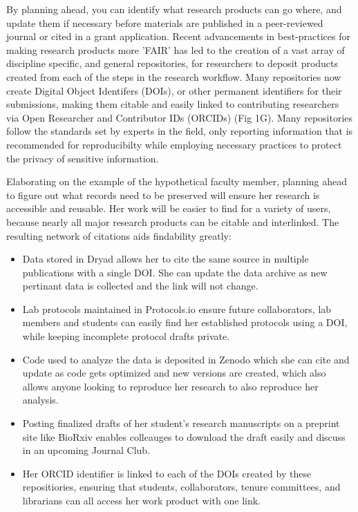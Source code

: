 \documentclass[10pt,letterpaper]{article}
\begin{document}
By planning ahead, you can identify what research products can go where, and update them if
necessary before materials are published in a peer-reviewed journal or cited in a 
grant application. 
Recent advancements in best-practices for making research products more 'FAIR' has led to the creation of a vast array of discipline specific, and general repositories\cite{PLOS2020}, for researchers to deposit products created from each of the steps in the research workflow.
Many repositories now create Digital Object Identifers (DOIs)\cite{DOI2020}, or other permanent identifiers
for their submissions, making them citable and easily linked to contributing researchers via Open 
Researcher and Contributor IDs (ORCIDs)\cite{ORCID2020} (Fig 1G). Many repositories follow the standards
set by experts in the field, only reporting information that is recommended for reproducibilty
while employing necessary practices to protect the privacy of sensitive information. 

Elaborating on the example of the hypothetical faculty member, planning ahead to figure out what records need to be preserved will ensure her research is accessible and reusable.  Her work will be easier to find for a variety of users, because nearly all major research products can be citable and interlinked.  The resulting network of citations aids findability greatly:

\begin{itemize}

\item
  Data stored in Dryad\cite{DRYAD2020} allows her to cite the same source in
  multiple publications with a single DOI. She can update the data archive as new
  pertinant data is collected and the link will not change.
 
\item
  Lab protocols maintained in Protocols.io\cite{Teytelman2016}
  ensure future collaborators, lab members and students can easily find her established
  protocols using a DOI, while keeping incomplete protocol drafts private.

\item
  Code used to analyze the data is deposited in Zenodo\cite{ZENODO2020} which she can cite and update
  as code gets optimized and new versions are created, which also allows anyone looking to reproduce her research to also reproduce her analysis.

\item
  Posting finalized drafts of her student's research manuscripts on a preprint site like BioRxiv\cite{bioRxiv2020}  enables colleauges to download the draft easily and 
  discuss in an upcoming Journal Club. 
  
  \item
  Her ORCID identifier is linked to each of the DOIs created by these repositiories, 
  ensuring that students, collaborators, tenure committees, 
  and librarians can all access her work product with one link.

\end{itemize}
\end{document}
